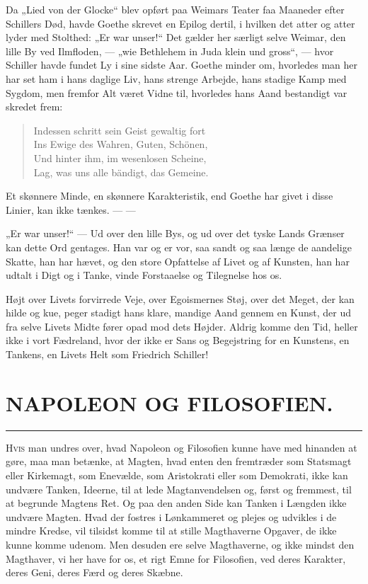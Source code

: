 \documentclass[12pt,a4paper,openany]{book}
\newcommand{\opage}[1]{\marginnote{\footnotesize\textit{[#1]}}}
\newcommand{\essay}[2][]{\chapter*{#2}\addcontentsline{toc}{chapter}{#1}}   %
\newcommand{\streg}{\begin{center}\rule{3em}{0.4pt}\end{center}}
\begin{document}
Da „Lied von der Glocke“ blev opført paa Weimars Teater
faa Maaneder efter Schillers Død, havde Goethe skrevet en
\setcounter{footnote}{0}%
\opage{183}Epilog dertil, i hvilken det atter og atter lyder med Stolthed:
„Er war unser!“ Det gælder her særligt selve Weimar, den
lille By ved Ilmfloden, --- „wie Bethlehem in Juda klein und
gross“, --- hvor Schiller havde fundet Ly i sine sidste Aar.
Goethe minder om, hvorledes man her har set ham i hans
daglige Liv, hans strenge Arbejde, hans stadige Kamp med
Sygdom, men fremfor Alt været Vidne til, hvorledes hans Aand
bestandigt var skredet frem:
\begin{quote}
Indessen schritt sein Geist gewaltig fort\\
Ins Ewige des Wahren, Guten, Schönen,\\
Und hinter ihm, im wesenlosen Scheine,\\
Lag, was uns alle bändigt, das Gemeine.
\end{quote}

Et skønnere Minde, en skønnere Karakteristik, end Goethe
har givet i disse Linier, kan ikke tænkes. --- ---

„Er war unser!“ --- Ud over den lille Bys, og ud over
det tyske Lands Grænser kan dette Ord gentages. Han var
og er vor, saa sandt og saa længe de aandelige Skatte, han
har hævet, og den store Opfattelse af Livet og af Kunsten,
han har udtalt i Digt og i Tanke, vinde Forstaaelse og Tilegnelse
hos os.

Højt over Livets forvirrede Veje, over Egoismernes Støj,
over det Meget, der kan hilde og kue, peger stadigt hans
klare, mandige Aand gennem en Kunst, der ud fra selve Livets
Midte fører opad mod dets Højder. Aldrig komme den
Tid, heller ikke i vort Fædreland, hvor der ikke er Sans og
Begejstring for en Kunstens, en Tankens, en Livets Helt som
Friedrich Schiller!

\setcounter{footnote}{0}%
\opage{184}\essay[Napoleon og Filosofien (1906)]{NAPOLEON OG FILOSOFIEN.}
\streg

H\textsc{vis} man undres over, hvad Napoleon og Filosofien kunne
have med hinanden at gøre, maa man betænke, at
Magten, hvad enten den fremtræder som Statsmagt eller Kirkemagt,
som Enevælde, som Aristokrati eller som Demokrati, ikke
kan undvære Tanken, Ideerne, til at lede Magtanvendelsen og,
først og fremmest, til at begrunde Magtens Ret. Og paa den
anden Side kan Tanken i Længden ikke undvære Magten. Hvad
der fostres i Lønkammeret og plejes og udvikles i de mindre
Kredse, vil tilsidst komme til at stille Magthaverne Opgaver,
de ikke kunne komme udenom. Men desuden ere selve Magthaverne,
og ikke mindst den Magthaver, vi her have for os,
et rigt Emne for Filosofien, ved deres Karakter, deres Geni,
deres Færd og deres Skæbne.
\end{document}
